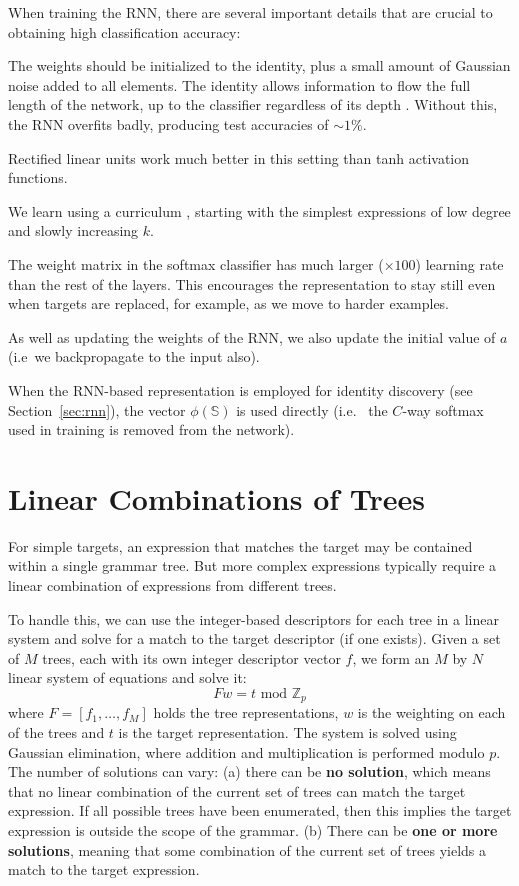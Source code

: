 \documentclass{article} %
\newcommand{\secc}[1]{Section~\ref{sec:#1}}
\begin{document}
When training the RNN, there are several important details that are
crucial to obtaining high classification accuracy:
\begin{compactitem}
\item The weights should be initialized to the identity, plus a small
  amount of Gaussian noise added to all elements. The identity allows
information to flow the full length of the network, up to the classifier regardless of
its depth \cite{saxe2013exact}. Without this, the RNN overfits badly,
producing test accuracies of $\sim 1\%$.
\item Rectified linear units work much better in this setting than tanh
  activation functions.
\item We learn using a curriculum \cite{Bengio09, zaremba2014learning}, starting with the simplest
  expressions of low degree and slowly increasing $k$.  
\item The weight matrix in the softmax classifier has much larger
  ($\times100$) learning rate than the rest of the layers. This
  encourages the representation to stay still even when targets are
  replaced, for example, as we move to harder examples.
\item As well as updating the weights of the RNN, we also update the
  initial value of $a$ (i.e~we backpropagate to the input also).
\end{compactitem}
When the RNN-based representation is employed for identity discovery (see
\secc{rnn}), the vector $\phi(\mathbb{S})$ is used directly (i.e.~ the
$C$-way softmax used in training is removed from the network).



\section{Linear Combinations of Trees}
\label{sec:linear}
For simple targets, an expression that matches the target may be contained within a single
grammar tree. But more complex expressions typically require
a linear combination of expressions from different trees. 

To handle this, we can use the integer-based
descriptors for each tree in a linear system 
and solve for a match to the target descriptor (if one exists).   
Given a set of $M$ trees, each with its own integer descriptor vector
$f$, we form an $M$ by $N$ linear system of equations and solve
it:
\begin{equation*}
Fw = t \text{ mod } \mathbb{Z}_p
\label{eqn:linear}
\end{equation*}
where $F = [f_1,\ldots, f_M]$ holds the tree representations, $w$ is
the weighting on each of the trees and $t$ is the target
representation. The system is solved using Gaussian elimination,
where addition and multiplication is performed
modulo $p$. 
The number of solutions can vary: (a) there can be {\bf no solution},
which means that no linear combination of
the current set of trees can match the target expression. If all
possible trees have been enumerated, then this implies the target
expression is outside the scope of the grammar. (b) There can be {\bf
  one or more solutions}, meaning that some combination of the
current set of trees yields a match to the target expression.
\end{document}

